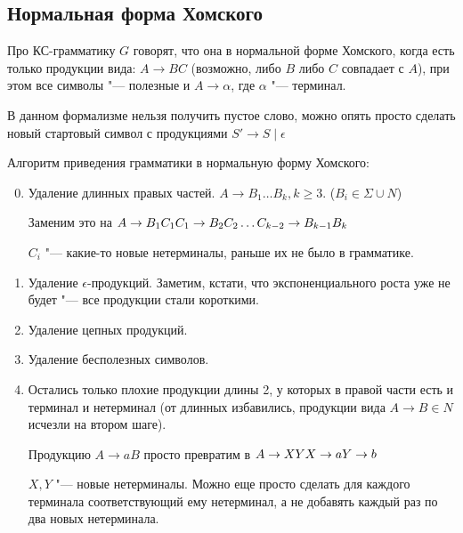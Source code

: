 \subsection{Нормальная форма Хомского}
\begin{Def}
Про КС-грамматику $G$ говорят, что она в нормальной форме Хомского, когда есть только продукции вида: $A \to BC$ (возможно, либо $B$ либо $C$ совпадает с $A$), при этом все символы "--- полезные и $A \to \alpha$, где $\alpha$ "--- терминал.
\end{Def}
\begin{Rem}
В данном формализме нельзя получить пустое слово, можно опять просто сделать новый стартовый символ с продукциями $S' \to S \mid \epsilon$
\end{Rem}                                                                                                                              

Алгоритм приведения грамматики в нормальную форму Хомского:

\begin{enumerate}
\setcounter{enumi}{-1}
\item
Удаление длинных правых частей.
$A \to B_1 \dots B_k, k \geq 3$. ($B_i \in \Sigma \cup N$) 

Заменим это на $\\
A \to B_1C_1 \\
C_1 \to B_2C_2 \\
\dots \\
C_{k-2} \to B_{k-1}B_k$
                                      
$C_i$ "--- какие-то новые нетерминалы, раньше их не было в грамматике.

\item
Удаление $\epsilon$-продукций. Заметим, кстати, что экспоненциального роста уже не будет "--- все продукции стали короткими.

\item
Удаление цепных продукций.

\item
Удаление бесполезных символов.

\item
Остались только плохие продукции длины 2, у которых в правой части есть и терминал и нетерминал (от длинных избавились, продукции вида $A \to B \in N$ исчезли на втором шаге).

Продукцию $A \to aB$ просто превратим в $\\
A \to XY \\
X \to a \\
Y \to b
$

$X, Y$ "--- новые нетерминалы.
Можно еще просто сделать для каждого терминала соответствующий ему нетерминал, а не добавять каждый раз по два новых нетерминала.
\end{enumerate}                        

